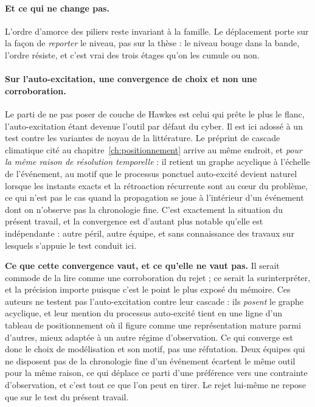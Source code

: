 \paragraph{Et ce qui ne change pas.} L'ordre d'amorce des piliers reste invariant à la
famille. Le déplacement porte sur la façon de \emph{reporter} le niveau, pas sur la thèse : le
niveau bouge dans la bande, l'ordre résiste, et c'est vrai des trois étages qu'on les cumule
ou non.

\paragraph{Sur l'auto-excitation, une convergence de choix et non une corroboration.} Le parti de
ne pas poser de couche de Hawkes est celui qui prête le plus le flanc, l'auto-excitation étant
devenue l'outil par défaut du cyber. Il est ici adossé à un test contre les variantes de noyau de
la littérature. Le préprint de cascade climatique cité au chapitre~\ref{ch:positionnement}
\citep{ccrn2026} arrive au même endroit, et \emph{pour la même raison de résolution temporelle} :
il retient un graphe acyclique à l'échelle de l'événement, au motif que le processus ponctuel
auto-excité devient naturel lorsque les instants exacts et la rétroaction récurrente sont au
c\oe ur du problème, ce qui n'est pas le cas quand la propagation se joue à l'intérieur d'un
événement dont on n'observe pas la chronologie fine. C'est exactement la situation du présent
travail, et la convergence est d'autant plus notable qu'elle est indépendante : autre péril,
autre équipe, et sans connaissance des travaux sur lesquels s'appuie le test conduit ici.

\begin{attention}
\textbf{Ce que cette convergence vaut, et ce qu'elle ne vaut pas.} Il serait commode de la lire
comme une corroboration du rejet ; ce serait la surinterpréter, et la précision importe puisque
c'est le point le plus exposé du mémoire. Ces auteurs ne testent pas l'auto-excitation contre
leur cascade : ils \emph{posent} le graphe acyclique, et leur mention du processus auto-excité
tient en une ligne d'un tableau de positionnement où il figure comme une représentation mature
parmi d'autres, mieux adaptée à un autre régime d'observation. Ce qui converge est donc le
choix de modélisation et son motif, pas une réfutation. Deux équipes qui ne disposent
pas de la chronologie fine d'un événement écartent le même outil pour la même raison, ce qui
déplace ce parti d'une préférence vers une contrainte d'observation, et c'est tout ce que l'on
peut en tirer. Le rejet lui-même ne repose que sur le test du présent travail.
\end{attention}

